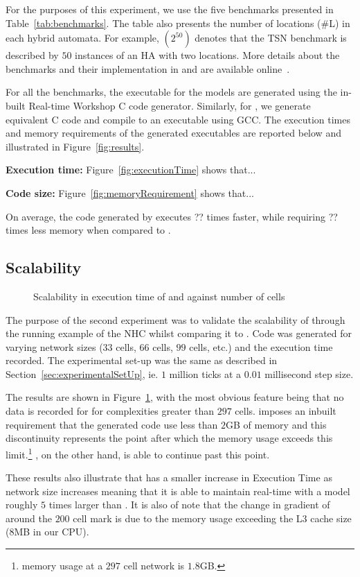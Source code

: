 For the purposes of this experiment, we use the five benchmarks presented in Table~\ref{tab:benchmarks}.
The table also presents the number of locations (\#L) in each hybrid automata.
For example, $(2^{50})$ denotes that the \acf{TSN} benchmark is described by $50$ instances of an \ac{HA} with two locations.
More details about the benchmarks and their implementation in \ourTool and \simulink are available online~\cite{githubBenchmarks}.

For all the benchmarks, the executable for the \simulink models are generated using the in-built Real-time Workshop\textsuperscript{\textregistered} C code generator.
Similarly, for \ourTool, we generate equivalent C code and compile to an executable using GCC.
The execution times and memory requirements of the generated executables are reported below and illustrated in Figure~\ref{fig:results}.

\textbf{Execution time:} 
Figure~\ref{fig:executionTime} shows that...

\textbf{Code size:}
Figure~\ref{fig:memoryRequirement} shows that...

On average, the code generated by \ourTool executes ?? times faster, while requiring ?? times less memory when compared to \simulink.




\subsection{Scalability}

\begin{figure}[htbp]
	\centering
	
	\caption{Scalability in  execution time of \simulink and \ourTool against number of cells}
	\label{fig:scalability}
\end{figure}

The purpose of the second experiment was to validate the scalability of \ourTool through the running example of the \ac{NHC} whilst comparing it to \simulink.
Code was generated for varying network sizes ($33$ cells, $66$ cells, $99$ cells, etc.) and the execution time recorded.
The experimental set-up was the same as described in Section~\ref{sec:experimentalSetUp}, ie. $1$ million ticks at a $0.01$ millisecond step size.

The results are shown in Figure~\ref{fig:scalability}, with the most obvious feature being that no data is recorded for \simulink for complexities greater than $297$ cells.
\simulink imposes an inbuilt requirement that the generated code use less than $2$GB of memory and this discontinuity represents the point after which the memory usage exceeds this limit.\footnote{\simulink memory usage at a $297$ cell network is $1.8$GB.}
\ourTool, on the other hand, is able to continue past this point.

These results also illustrate that \ourTool has a smaller increase in Execution Time as network size increases meaning that it is able to maintain real-time with a model roughly $5$ times larger than \simulink.
It is also of note that the change in gradient of \ourTool around the $200$ cell mark is due to the memory usage exceeding the L$3$ cache size ($8$MB in our CPU).